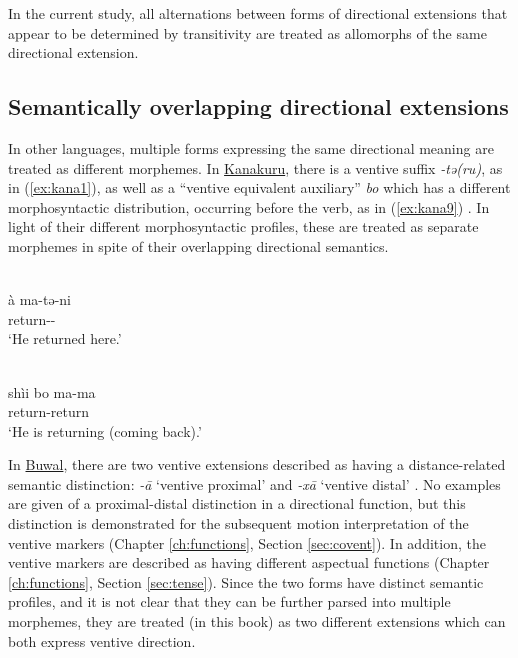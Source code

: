 In the current study, all alternations between forms of directional extensions that appear to be determined by transitivity are treated as allomorphs of the same directional extension.

\subsection{Semantically overlapping directional extensions}

In other languages, multiple forms expressing the same directional meaning are treated as different morphemes. In \hyperref[kana]{Kanakuru}, there is a ventive suffix \textit{-tə(ru)}, as in (\ref{ex:kana1}), as well as a ``ventive equivalent auxiliary'' \textit{bo} which has a different morphosyntactic distribution, occurring before the verb, as in (\ref{ex:kana9}) \citep[76]{newmanKanakuruLanguage1974}. In light of their different morphosyntactic profiles, these are treated as separate morphemes in spite of their overlapping directional semantics.

\ea\label{ex:kana1}
 \\
\gll à	ma-tə-ni \\
 return-- \\
\glt `He returned here.'

\ex\label{ex:kana9}
 \\
\gll shìi	bo	ma-ma	\\
		return-return	 \\
\glt `He is returning (coming back).'
\z 

In \hyperref[buwa]{Buwal}, there are two ventive extensions described as having a distance-related semantic distinction: \textit{-ā} `ventive proximal' and \textit{-xā} `ventive distal' \citep{viljoenGrammaticalDescriptionBuwal2013}. No examples are given of a proximal-distal distinction in a directional function, but this distinction is demonstrated for the subsequent motion interpretation of the ventive markers (Chapter \ref{ch:functions}, Section \ref{sec:covent}). In addition, the ventive markers are described as having different aspectual functions (Chapter \ref{ch:functions}, Section \ref{sec:tense}). Since the two forms have distinct semantic profiles, and it is not clear that they can be further parsed into multiple morphemes, they are treated (in this book) as two different extensions which can both express ventive direction. 

